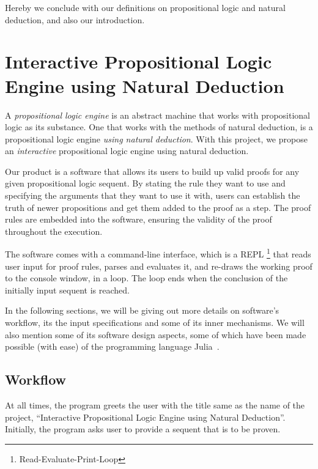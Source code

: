 \documentclass[12pt]{article}
\begin{document}
Hereby we conclude with our definitions on propositional logic
and natural deduction, and also our introduction.

\section{Interactive Propositional Logic Engine using Natural Deduction}

A \textit{propositional logic engine} is an abstract machine that
works with propositional logic as its substance. One that works
with the methods of natural deduction, is a propositional logic
engine \textit{using natural deduction}. With this project,
we propose an \textit{interactive} propositional logic engine
using natural deduction.

Our product is a software that allows its users to build up valid proofs
for any given propositional logic sequent. By stating the rule they
want to use and specifying the arguments that they want to use it with,
users can establish the truth of newer propositions and get them added
to the proof as a step. The proof rules are embedded into the software,
ensuring the validity of the proof throughout the execution.

The software comes with a command-line interface, which is a REPL%
\footnote{Read-Evaluate-Print-Loop}
that reads user input for proof rules, parses and evaluates it, and
re-draws the working proof to the console window, in a loop. The
loop ends when the conclusion of the initially input sequent is reached.

In the following sections, we will be giving out more details on
software's workflow, its the input specifications and some of its
inner mechanisms. We will also mention some of its software design
aspects, some of which have been made possible (with ease) of the
programming language Julia~\cite{julia}.

\subsection{Workflow}

At all times, the program greets the user with the title same as the
name of the project, ``Interactive Propositional Logic Engine using
Natural Deduction''. Initially, the program asks user to provide
a sequent that is to be proven.
\end{document}
